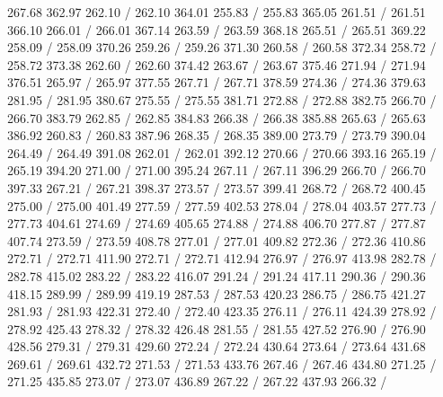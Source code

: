 { 267.68 362.97 262.10 /
 262.10 364.01 255.83 /
 255.83 365.05 261.51 /
 261.51 366.10 266.01 /
 266.01 367.14 263.59 /
 263.59 368.18 265.51 /
 265.51 369.22 258.09 /
 258.09 370.26 259.26 /
 259.26 371.30 260.58 /
 260.58 372.34 258.72 /
 258.72 373.38 262.60 /
 262.60 374.42 263.67 /
 263.67 375.46 271.94 /
 271.94 376.51 265.97 /
 265.97 377.55 267.71 /
 267.71 378.59 274.36 /
 274.36 379.63 281.95 /
 281.95 380.67 275.55 /
 275.55 381.71 272.88 /
 272.88 382.75 266.70 /
 266.70 383.79 262.85 /
 262.85 384.83 266.38 /
 266.38 385.88 265.63 /
 265.63 386.92 260.83 /
 260.83 387.96 268.35 /
 268.35 389.00 273.79 /
 273.79 390.04 264.49 /
 264.49 391.08 262.01 /
 262.01 392.12 270.66 /
 270.66 393.16 265.19 /
 265.19 394.20 271.00 /
 271.00 395.24 267.11 /
 267.11 396.29 266.70 /
 266.70 397.33 267.21 /
 267.21 398.37 273.57 /
 273.57 399.41 268.72 /
 268.72 400.45 275.00 /
 275.00 401.49 277.59 /
 277.59 402.53 278.04 /
 278.04 403.57 277.73 /
 277.73 404.61 274.69 /
 274.69 405.65 274.88 /
 274.88 406.70 277.87 /
 277.87 407.74 273.59 /
 273.59 408.78 277.01 /
 277.01 409.82 272.36 /
 272.36 410.86 272.71 /
 272.71 411.90 272.71 /
 272.71 412.94 276.97 /
 276.97 413.98 282.78 /
 282.78 415.02 283.22 /
 283.22 416.07 291.24 /
 291.24 417.11 290.36 /
 290.36 418.15 289.99 /
 289.99 419.19 287.53 /
 287.53 420.23 286.75 /
 286.75 421.27 281.93 /
 281.93 422.31 272.40 /
 272.40 423.35 276.11 /
 276.11 424.39 278.92 /
 278.92 425.43 278.32 /
 278.32 426.48 281.55 /
 281.55 427.52 276.90 /
 276.90 428.56 279.31 /
 279.31 429.60 272.24 /
 272.24 430.64 273.64 /
 273.64 431.68 269.61 /
 269.61 432.72 271.53 /
 271.53 433.76 267.46 /
 267.46 434.80 271.25 /
 271.25 435.85 273.07 /
 273.07 436.89 267.22 /
 267.22 437.93 266.32 /
}
